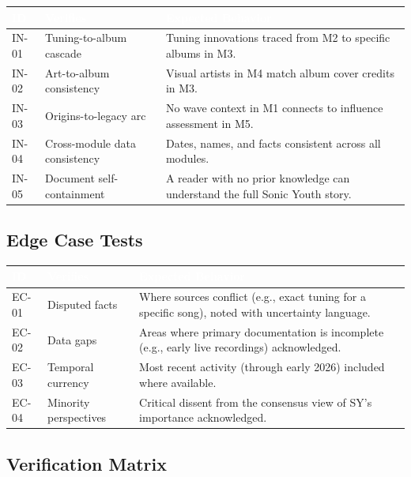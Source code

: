 \documentclass[11pt,letterpaper]{article}
\newcommand{\tableheader}[1]{\textbf{\sffamily\textcolor{white}{#1}}}
\begin{document}
\begin{center}
\begin{tabularx}{\textwidth}{C{1.2cm}L{3.5cm}X}
\toprule
{}
\tableheader{ID} & \tableheader{Verifies} & \tableheader{Expected Behavior} \\
\midrule
IN-01 & Tuning-to-album cascade & Tuning innovations traced from M2 to specific albums in M3. \\
IN-02 & Art-to-album consistency & Visual artists in M4 match album cover credits in M3. \\
IN-03 & Origins-to-legacy arc & No wave context in M1 connects to influence assessment in M5. \\
IN-04 & Cross-module data consistency & Dates, names, and facts consistent across all modules. \\
IN-05 & Document self-containment & A reader with no prior knowledge can understand the full Sonic Youth story. \\
\bottomrule
\end{tabularx}
\end{center}

\subsection{Edge Case Tests}

\begin{center}
\begin{tabularx}{\textwidth}{C{1.2cm}L{3.5cm}X}
\toprule
{}
\tableheader{ID} & \tableheader{Verifies} & \tableheader{Expected Behavior} \\
\midrule
EC-01 & Disputed facts & Where sources conflict (e.g., exact tuning for a specific song), noted with uncertainty language. \\
EC-02 & Data gaps & Areas where primary documentation is incomplete (e.g., early live recordings) acknowledged. \\
EC-03 & Temporal currency & Most recent activity (through early 2026) included where available. \\
EC-04 & Minority perspectives & Critical dissent from the consensus view of SY's importance acknowledged. \\
\bottomrule
\end{tabularx}
\end{center}

\subsection{Verification Matrix}
\end{document}
